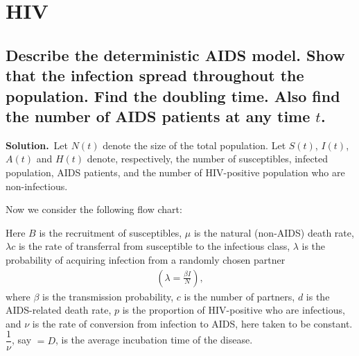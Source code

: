 \chapter{HIV}
\section{Describe the deterministic AIDS model. Show that the infection spread throughout the population. Find the doubling time. Also find the number of AIDS patients at any time $t$.}
\noindent\textbf{Solution.}\ Let $N(t)$ denote the size of the total population. Let $S(t)$, $I(t)$, $A(t)$ and $H(t)$ denote, respectively, the number of susceptibles, infected population, AIDS patients, and the number of HIV-positive population who are non-infectious.

Now we consider the following flow chart:

\begin{center}
\end{center}

Here $B$ is the recruitment of susceptibles, $\mu$ is the natural (non-AIDS) death rate, $\lambda c$ is the rate of transferral from susceptible to the infectious class, $\lambda$ is the probability of acquiring infection from a randomly chosen partner
\begin{align*}
    \left(\lambda = \frac{\beta I}{N}\right),
\end{align*}
where $\beta$ is the transmission probability, $c$ is the number of partners, $d$ is the AIDS-related death rate, $p$ is the proportion of HIV-positive who are infectious, and $\nu$ is the rate of conversion from infection to AIDS, here taken to be constant. $\dfrac{1}{\nu}$, say $=D$, is the average incubation time of the disease.


